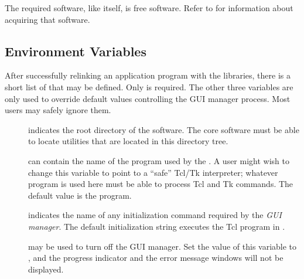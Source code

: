 The required software, like \opendap itself, is free software. Refer to
 for information about acquiring that software.

\subsection{Environment Variables}
\label{opd-client,environment}

After successfully relinking an application program with the \opendap
libraries, there is a short list of  that
may be defined.  Only  is required. The other three
variables are only used to override default values controlling the GUI
manager process. Most users may safely ignore them.

\begin{description}
\item[]  indicates the root directory of the \opendap
  software. The \opendap core software must be able to locate utilities
  that are located in this directory tree.  
  
\item[] can contain the name of the program used by the
  .  A user might wish to change this variable to
  point to a ``safe'' Tcl/Tk interpreter; whatever program is used
  here must be able to process Tcl and Tk commands.  The default value
  is the  program.   
  
\item[] indicates the name of any initialization
  command required by the {\em GUI manager}. The default
  initialization string executes the Tcl program in
  .  
   
   
  
\item[] may be used to turn off the GUI manager. Set
  the value of this variable to , and the progress indicator
  and the error message windows will not be displayed.
   

\end{description}

